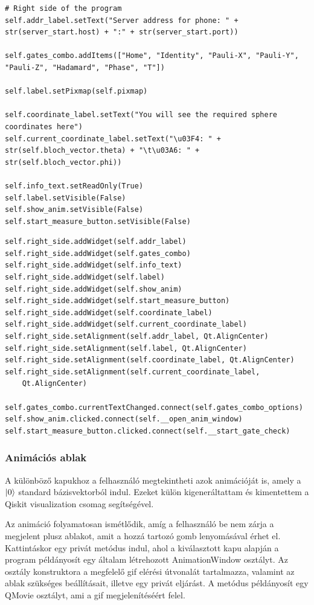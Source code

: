 \documentclass[
]{thesis-ekf}
\theoremstyle{definition}
\theoremstyle{remark}
\begin{document}
\begin{lstlisting}[caption={A jobb oldali panel elemeinek értékadása}]
# Right side of the program
self.addr_label.setText("Server address for phone: " + str(server_start.host) + ":" + str(server_start.port))

self.gates_combo.addItems(["Home", "Identity", "Pauli-X", "Pauli-Y", "Pauli-Z", "Hadamard", "Phase", "T"])

self.label.setPixmap(self.pixmap)

self.coordinate_label.setText("You will see the required sphere coordinates here")
self.current_coordinate_label.setText("\u03F4: " + str(self.bloch_vector.theta) + "\t\u03A6: " + str(self.bloch_vector.phi))

self.info_text.setReadOnly(True)
self.label.setVisible(False)
self.show_anim.setVisible(False)
self.start_measure_button.setVisible(False)
\end{lstlisting}

\begin{lstlisting}[caption={Elemek hozzáadása a jobb oldali panelhez, gombok beállítása}]
self.right_side.addWidget(self.addr_label)
self.right_side.addWidget(self.gates_combo)
self.right_side.addWidget(self.info_text)
self.right_side.addWidget(self.label)
self.right_side.addWidget(self.show_anim)
self.right_side.addWidget(self.start_measure_button)
self.right_side.addWidget(self.coordinate_label)
self.right_side.addWidget(self.current_coordinate_label)
self.right_side.setAlignment(self.addr_label, Qt.AlignCenter)
self.right_side.setAlignment(self.label, Qt.AlignCenter)
self.right_side.setAlignment(self.coordinate_label, Qt.AlignCenter)
self.right_side.setAlignment(self.current_coordinate_label,
	Qt.AlignCenter)

self.gates_combo.currentTextChanged.connect(self.gates_combo_options)
self.show_anim.clicked.connect(self.__open_anim_window)
self.start_measure_button.clicked.connect(self.__start_gate_check)
\end{lstlisting}

\subsubsection{Animációs ablak}
A különböző kapukhoz a felhasználó megtekintheti azok animációját is, amely a $\ket{0}$ standard bázisvektorból indul. Ezeket külön kigeneráltattam és kimentettem a Qiskit visualization csomag segítségével. 

Az animáció folyamatosan ismétlődik, amíg a felhasználó be nem zárja a megjelent plusz ablakot, amit a hozzá tartozó gomb lenyomásával érhet el. Kattintáskor egy privát metódus indul, ahol a kiválasztott kapu alapján a program példányosít egy általam létrehozott AnimationWindow osztályt. Az osztály konstruktora a megfelelő gif elérési útvonalát tartalmazza, valamint az ablak szükséges beállításait, illetve egy privát eljárást. A metódus példányosít egy QMovie osztályt, ami a gif megjelenítéséért felel.
\end{document}
